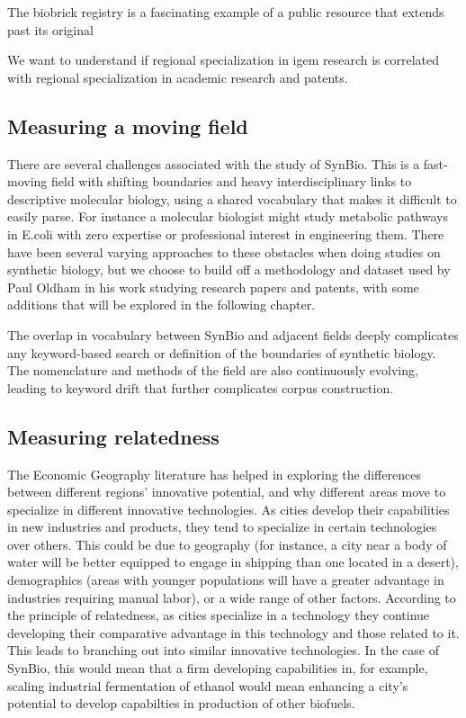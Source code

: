 \documentclass[12pt,a4paper]{article}
\begin{document}
	The biobrick registry is a fascinating example of a public resource that extends past its original
	
	We want to understand if regional specialization in igem research is correlated with regional specialization in academic research and patents.
	
	
	
	\subsection{Measuring a moving field}
	
	There are several challenges associated with the study of SynBio. This is a fast-moving field with shifting boundaries and heavy interdisciplinary links to descriptive molecular biology, using a shared vocabulary that makes it difficult to easily parse. For instance a molecular biologist might study metabolic pathways in E.coli with zero expertise or professional interest in engineering them. There have been several varying approaches to these obstacles when doing studies on synthetic biology, but we choose to build off a methodology and dataset used by Paul Oldham in his work studying research papers and patents, with some additions that will be explored in the following chapter.
	
	The overlap in vocabulary between SynBio and adjacent fields deeply complicates any keyword-based search or definition of the boundaries of synthetic biology. The nomenclature and methods of the field are also continuously evolving, leading to keyword drift that further complicates corpus construction. 
	
	\subsection{Measuring relatedness}
	The Economic Geography literature has helped in exploring the differences between different regions' innovative potential, and why different areas move to specialize in different innovative technologies. As cities develop their capabilities in new industries and products, they tend to specialize in certain technologies over others. This could be due to geography (for instance, a city near a body of water will be better equipped to engage in shipping than one located in a desert), demographics (areas with younger populations will have a greater advantage in industries requiring manual labor), or a wide range of other factors. According to the principle of relatedness, as cities specialize in a technology they continue developing their comparative advantage in this technology and those related to it. This leads to branching out into similar innovative technologies. In the case of SynBio, this would mean that a firm developing capabilities in, for example, scaling industrial fermentation of ethanol would mean enhancing a city's potential to develop capabilties in production of other biofuels.
	
\end{document}
